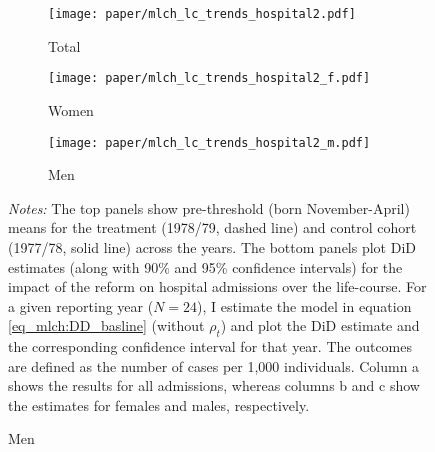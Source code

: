 \begin{landscape}
	\vspace*{\fill}
	\begin{figure}[H]\centering
		\caption{Life-course approach for \textbf{hospital admission}}\label{fig_mlch: lc_hospital2_frg_DD}
		\begin{subfigure}[h]{0.31\linewidth}\centering\caption{Total}
			\texttt{[image: paper/mlch\_lc\_trends\_hospital2.pdf]}
		\end{subfigure}
		\begin{subfigure}[h]{0.31\linewidth}\centering\caption{Women}
			\texttt{[image: paper/mlch\_lc\_trends\_hospital2\_f.pdf]}
		\end{subfigure}
		\begin{subfigure}[h]{0.31\linewidth}\centering\caption{Men}
			\texttt{[image: paper/mlch\_lc\_trends\_hospital2\_m.pdf]}
		\end{subfigure}
	
		\scriptsize
		\begin{minipage}{\linewidth}
			\emph{Notes:} The top panels show pre-threshold (born November-April) means for the treatment (1978/79, dashed line) and control cohort (1977/78, solid line) across the years. The bottom panels plot DiD estimates (along with 90\% and 95\% confidence intervals) for the impact of the reform on hospital admissions over the life-course. For a given reporting year ($N=24$), I estimate the model in equation \ref{eq_mlch:DD_basline} (without $\rho_t$) and plot the DiD estimate and the corresponding confidence interval for that year. The outcomes are defined as the number of cases per 1,000 individuals. Column a shows the results for all admissions, whereas columns b and c show the estimates for females and males, respectively.
		\end{minipage}
	\end{figure}
	\vspace*{\fill}\clearpage
\end{landscape}
\restoregeometry


%


